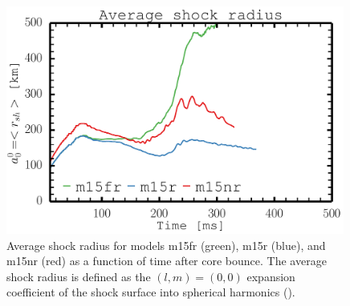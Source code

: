 \begin{figure}[ht]         
\centering                            
\includegraphics[width=0.99\textwidth]{./images/paper2/rsh.pdf}
\caption{Average shock radius for models m15fr (green), m15r (blue), and m15nr (red) as a function of 
time after core bounce. The average shock radius is defined as the $(l,m) = (0,0)$ expansion coefficient of the shock surface into 
spherical harmonics (). \label{figp2:rsh}}
\end{figure}
